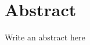 
\chapter*{Abstract}
 
 Write an abstract here








 \setcounter{tocdepth}{4}
 \tableofcontents











